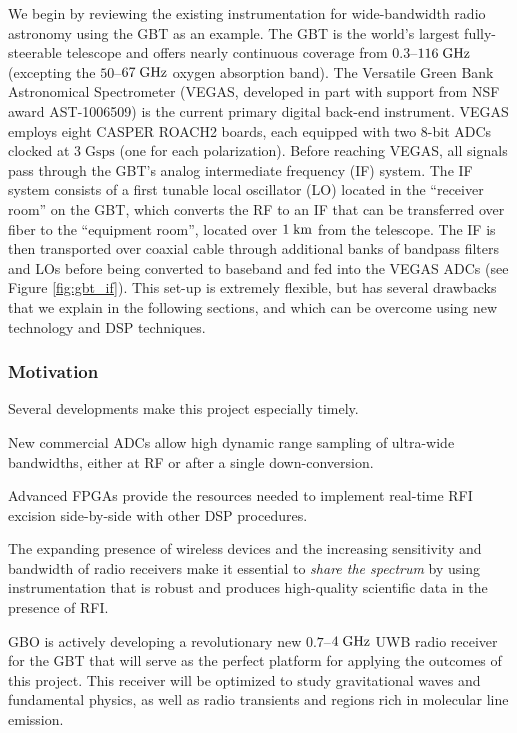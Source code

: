 \documentclass[10pt]{myNSF}
\begin{document}
We begin by reviewing the existing instrumentation for wide-bandwidth
radio astronomy using the GBT as an example.  The GBT is the world's
largest fully-steerable telescope and offers nearly continuous
coverage from $0.3$--$116\; \textrm{GHz}$ (excepting the $50$--$67\; \textrm{GHz}$
oxygen absorption band).  The Versatile Green Bank Astronomical
Spectrometer (VEGAS, developed in part with support from NSF award
AST-1006509) is the current primary digital back-end instrument.
VEGAS employs eight CASPER ROACH2 boards, each equipped with two 8-bit
ADCs clocked at $3\; \mathrm{Gsps}$ (one for each polarization).
Before reaching VEGAS, all signals pass through the GBT's analog
intermediate frequency (IF) system.  The IF system consists of a first
tunable local oscillator (LO) located in the ``receiver room'' on the
GBT, which converts the RF to an IF that can be transferred over fiber
to the ``equipment room'', located over $1\; \textrm{km}$ from the telescope.
The IF is then transported over coaxial cable through additional banks
of bandpass filters and LOs before being converted to baseband and fed
into the VEGAS ADCs (see Figure \ref{fig:gbt_if}).  This set-up is
extremely flexible, but has several drawbacks that we explain in the
following sections, and which can be overcome using new technology and
DSP techniques.

\subsubsection{Motivation}
\label{sec:motivation}

Several developments make this project especially timely.
\begin{itemize*}
\item{New commercial ADCs allow high dynamic range sampling of
  ultra-wide bandwidths, either at RF or after a single
  down-conversion.}
\item{Advanced FPGAs provide the resources needed to implement
  real-time RFI excision side-by-side with other DSP procedures.}
\item{The expanding presence of wireless devices and the increasing
  sensitivity and bandwidth of radio receivers make it essential to
  \emph{share the spectrum} by using instrumentation that is robust
  and produces high-quality scientific data in the presence of RFI.}
\item{GBO is actively developing a revolutionary new $0.7$--$4\; \textrm{GHz}$
  UWB radio receiver for the GBT that will serve as the perfect
  platform for applying the outcomes of this project.  This receiver
  will be optimized to study gravitational waves and fundamental
  physics, as well as radio transients and regions rich in molecular
  line emission.}
\end{itemize*}
\end{document}
